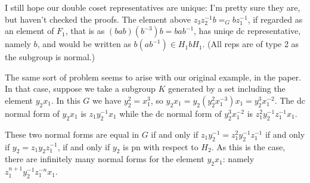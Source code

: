 \documentclass[a4paper,12pt]{article}
\numberwithin{equation}{section}
\numberwithin{figure}{section}
\begin{document}
I still hope our double coset representatives are unique: I'm pretty sure
they are, but haven't checked the proofs. The element above 
$z_3z_2^{-1}b=_G bz_1^{-1}$, if regarded as an element of $F_1$, that is
as $(bab)(b^{-3})b=bab^{-1}$, has uniqe dc representative, namely $b$, and 
would be written as $b(ab^{-1})\in H_1bH_1$.
(All reps are of type 2 as the subgroup is normal.)

The same sort of problem seems to arise with our original example, in the paper.
In that case, suppose we take a subgroup $K$ generated by a set including the 
element $y_2x_1$. In this $G$ we have
$y_2^2=x_1^3$, so $y_2x_1=y_2(y_2^2x_1^{-3})x_1=y_2^3x_1^{-2}$. The dc normal 
form of $y_2x_1$ is $z_1y_2^{-1}x_1$ while the dc normal form of $y_2^3x_1^{-2}$
 is $z_1^2y_2^{-1}z_1^{-1}x_1$.

These two normal forms are equal in $G$ if and only if $z_1y_2^{-1}= z_1^2y_2^{-1}z_1^{-1}$
if and only if $y_2=z_1y_2z_1^{-1}$, if and only if $y_2$ is pn with respect to $H_2$. As this is the case, there are infinitely many normal forms
for the element $y_2x_1$: namely $z_1^{n+1}y_2^{-1}z_1^{-n}x_1$. 
\end{document}
